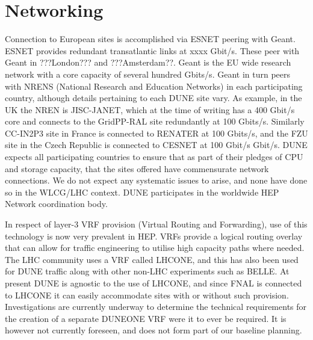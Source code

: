 \chapter{Networking }
\label{ch:netw}





Connection to European sites is accomplished via ESNET peering with Geant.  
ESNET provides redundant transatlantic links at xxxx Gbit/s. These peer with Geant in ???London??? and ???Amsterdam??.
Geant is the EU wide research network with a core capacity of several hundred Gbits/s. Geant in turn peers with NRENS (National Research and Education Networks) in each participating country, although details pertaining to each DUNE site vary. As example, in the UK the NREN is JISC-JANET, which at the time of writing has a 400 Gbit/s core and connects to the GridPP-RAL site redundantly at 100 Gbits/s. 
Similarly CC-IN2P3 site in France is connected to RENATER at 100 Gbits/s, and the FZU site in the Czech Republic is connected to CESNET at 100 Gbit/s Gbit/s.  DUNE expects all participating countries to ensure that as part of their pledges of CPU and storage capacity, that the sites offered have commensurate network connections. We do not expect any systematic issues to arise, and none have done so in the WLCG/LHC context. DUNE participates in the worldwide HEP Network coordination body.

In respect of layer-3 VRF provision (Virtual Routing and Forwarding), use of this technology is now very prevalent in HEP. VRFs provide a logical routing overlay that can allow for traffic engineering to utilise high capacity paths where needed. The LHC community uses a VRF called LHCONE, and this has also been used for DUNE traffic along with other non-LHC experiments such as BELLE. 
At present DUNE is agnostic to the use of LHCONE, and since FNAL is connected to LHCONE it can easily accommodate sites with or without such provision.
Investigations are currently underway to determine the technical requirements for the creation of a separate DUNEONE VRF were it to ever be required. It is however not currently foreseen, and does not form part of our baseline planning.